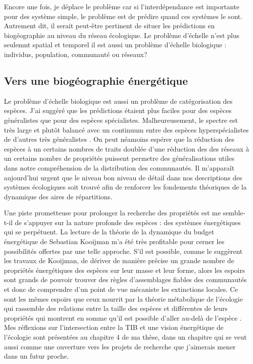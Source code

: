 Encore une fois, je déplace le problème car si l'interdépendance est
importante pour des système simple, le problème est de prédire quand ces
systèmes le sont. Autrement dit, il serait peut-être pertinent de situer
les prédictions en biogéographie au niveau du réseau écologique. Le
problème d'échelle n'est plus seulemnt spatial et temporel il est aussi
un problème d'échelle biologique : individus, population, communauté ou
réseaux?

\subsection*{Vers une biogéographie
énergétique}\label{vers-une-bioguxe9ographie-uxe9nerguxe9tique}

Le problème d'échelle biologique est aussi un problème de catégorisation
des espèces. J'ai suggéré que les prédictions étaient plus faciles pour
des espèces généralistes que pour des espèces spécialistes.
Malheureusement, le spectre est très large et plutôt balancé avec un
continuum entre des espèces hyperspécialistes de d'autres très
généralistes \citep{Poisot2015c}. On peut néamoins espérer que la
réduction des espèces à un certains nombres de traits
\citep[\citet{Poisot2015}]{McGill2006} doublée d'une réduction des des
réseaux à un certains nombre de propriétés puissent permetre des
généralisations utiles dans notre compréhension de la distribution des
communautés. Il m'apparaît aujourd'hui urgent que le niveau bon niveau
de détail dans nos descriptions des systèmes écologiques soit trouvé
afin de renforcer les fondements théoriques de la dynamique des aires de
répartitions.

Une piste prometteuse pour prolonger la recherche des propriétés est me
semble-t-il de s'appuyer sur la nature profonde des espèces : des
systèmes énergétiques qui se perpétuent. La lecture de la théorie de la
dynamique du budget énergétique de Sebastian Kooijman
\citep{Kooijman2000a} m'a été très profitable pour cerner les
possibilités offertes par une telle approche. S'il est possible, comme
le suggèrent les travaux de Kooijman, de dériver de manière précise un
grande nombre de propriétés énergétiques des espèces sur leur masse et
leur forme, alors les espoirs sont grands de pouvoir trouver des règles
d'assemblages fiables des communautés et donc de comprendre d'un point
de vue mécaniste les extinctions locales. Ce sont les mêmes espoirs que
ceux nourrit par la théorie métabolique de l'écologie qui rassemble des
relations entre la taille des espèces et différentes de leurs propriétés
\citep{Brown2004} qui montrent en somme qu'il est possible d'aller
au-delà de l'espèce \citep{Poisot2015}. Mes réflexions sur
l'intersection entre la TIB et une vision énergétique de l'écologie sont
présentées au chapitre 4 de ma thèse, dans un chapitre qui se veut aussi
comme une ouverture vers les projets de recherche que j'aimerais mener
dans un futur proche.
